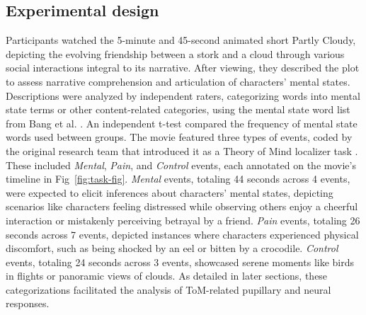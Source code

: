 \subsection*{Experimental design }
Participants watched the 5-minute and 45-second animated short Partly Cloudy, depicting the evolving friendship between a stork and a cloud through various social interactions integral to its narrative. After viewing, they described the plot to assess narrative comprehension and articulation of characters' mental states. Descriptions were analyzed by independent raters, categorizing words into mental state terms or other content-related categories, using the mental state word list from Bang et al. \citep{bang2013}. An independent t-test compared the frequency of mental state words used between groups. The movie featured three types of events, coded by the original research team that introduced it as a Theory of Mind localizer task \citep{jacoby2016}. These included \textit{Mental}, \textit{Pain}, and \textit{Control} events, each annotated on the movie's timeline in Fig~\ref{fig:task-fig}. \textit{Mental} events, totaling 44 seconds across 4 events, were expected to elicit inferences about characters' mental states, depicting scenarios like characters feeling distressed while observing others enjoy a cheerful interaction or mistakenly perceiving betrayal by a friend. \textit{Pain} events, totaling 26 seconds across 7 events, depicted instances where characters experienced physical discomfort, such as being shocked by an eel or bitten by a crocodile. \textit{Control} events, totaling 24 seconds across 3 events, showcased serene moments like birds in flights or panoramic views of clouds. As detailed in later sections, these categorizations facilitated the analysis of ToM-related pupillary and neural responses.



